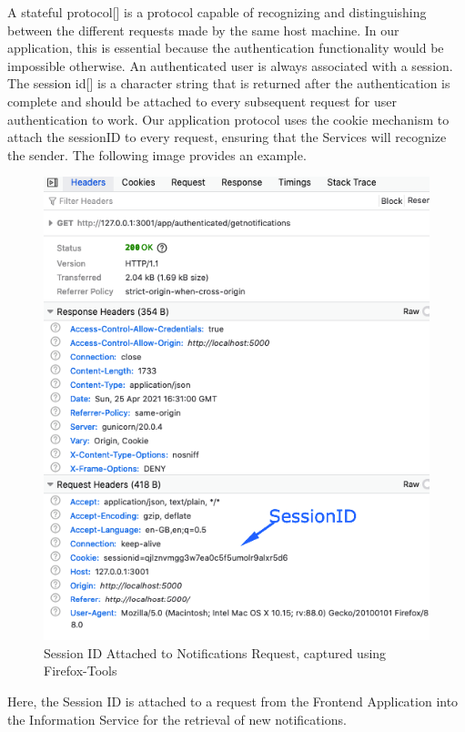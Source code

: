 			
			A stateful protocol[\cite{session-rfc6265}] is a protocol capable of recognizing and distinguishing between the different requests made by the 
			same host machine.  In our application, this is essential because the authentication functionality would be impossible 
			otherwise. An authenticated user is always associated with a session. The session id[\cite{sessionID-rfc7329}] is a character string that is returned 
			after the authentication is complete and should be attached to every subsequent request for user authentication to work. 
			Our application protocol uses the cookie mechanism to attach the sessionID to every request, ensuring that the Services 
			will recognize the sender. The following image provides an example.
			\begin{figure}[H]
				\iftrue
				\caption{Session ID Attached to Notifications Request, captured using Firefox-Tools}
				\centering
				\includegraphics[scale=0.3]{figures/sessionID}
				\fi
			\end{figure} 
			Here, the Session ID is attached to a request from the Frontend Application into the Information Service for the retrieval of new notifications.
